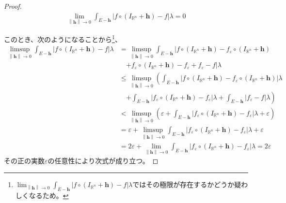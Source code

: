 \documentclass[dvipdfmx]{jsarticle}
\begin{document}
\begin{proof}
\begin{align*}
\lim_{\left\| \mathbf{h} \right\| \rightarrow 0}{\int_{E - \mathbf{h}} {\left| f \circ \left( I_{\mathbb{R}^{n}} + \mathbf{h} \right) - f \right|\lambda}} = 0
\end{align*}\par
このとき、次のようになることから\footnote{$\lim_{\left\| \mathbf{h} \right\| \rightarrow 0}{\int_{E - \mathbf{h}} {\left| f \circ \left( I_{\mathbb{R}^{n}} + \mathbf{h} \right) - f \right|\lambda}}$ではその極限が存在するかどうか疑わしくなるため。}、
\begin{align*}
\limsup_{\left\| \mathbf{h} \right\| \rightarrow 0}{\int_{E - \mathbf{h}} {\left| f \circ \left( I_{\mathbb{R}^{n}} + \mathbf{h} \right) - f \right|\lambda}} &= \limsup_{\left\| \mathbf{h} \right\| \rightarrow 0}\int_{E - \mathbf{h}} \left| f \circ \left( I_{\mathbb{R}^{n}} + \mathbf{h} \right) - f_{\varepsilon} \circ \left( I_{\mathbb{R}^{n}} + \mathbf{h} \right) \right. \\
&\quad \left. + f_{\varepsilon} \circ \left( I_{\mathbb{R}^{n}} + \mathbf{h} \right) - f_{\varepsilon} + f_{\varepsilon} - f \right|\lambda\\
&\leq \limsup_{\left\| \mathbf{h} \right\| \rightarrow 0} \left( \int_{E - \mathbf{h}}  \left| f \circ \left( I_{\mathbb{R}^{n}} + \mathbf{h} \right) - f_{\varepsilon} \circ \left( I_{\mathbb{R}^{n}} + \mathbf{h} \right) \right| \lambda \right. \\
&\quad \left. + \int_{E - \mathbf{h}} {\left| f_{\varepsilon} \circ \left( I_{\mathbb{R}^{n}} + \mathbf{h} \right) - f_{\varepsilon} \right|\lambda} + \int_{E - \mathbf{h}}  \left| f_{\varepsilon} - f \right|\lambda \right)\\
&< \limsup_{\left\| \mathbf{h} \right\| \rightarrow 0}\left( \varepsilon + \int_{E - \mathbf{h}} {\left| f_{\varepsilon} \circ \left( I_{\mathbb{R}^{n}} + \mathbf{h} \right) - f_{\varepsilon} \right|\lambda} + \varepsilon \right)\\
&= \varepsilon + \limsup_{\left\| \mathbf{h} \right\| \rightarrow 0}{\int_{E - \mathbf{h}} {\left| f_{\varepsilon} \circ \left( I_{\mathbb{R}^{n}} + \mathbf{h} \right) - f_{\varepsilon} \right|\lambda}} + \varepsilon\\
&= 2\varepsilon + \lim_{\left\| \mathbf{h} \right\| \rightarrow 0}{\int_{E - \mathbf{h}} {\left| f_{\varepsilon} \circ \left( I_{\mathbb{R}^{n}} + \mathbf{h} \right) - f_{\varepsilon} \right|\lambda}} = 2\varepsilon
\end{align*}
その正の実数$\varepsilon$の任意性により次式が成り立つ。

\end{proof}
\end{document}
